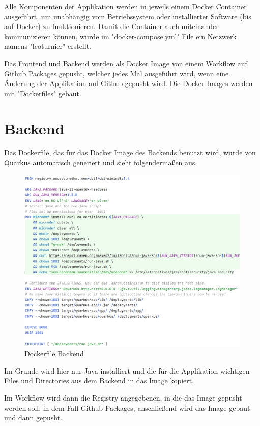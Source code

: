 Alle Komponenten der Applikation werden in jeweils einem Docker Container ausgeführt, um unabhängig vom Betriebssystem oder installierter Software (bis auf Docker) zu funktionieren. 
Damit die Container auch miteinander kommunizieren können, wurde im "docker-compose.yml" File ein Netzwerk namens "leoturnier" erstellt.

Das Frontend und Backend werden als Docker Image von einem Workflow auf Github Packages gepusht, welcher jedes Mal ausgeführt wird, wenn eine Änderung der Applikation auf Github gepusht wird.
Die Docker Images werden mit "Dockerfiles" gebaut. 

\section{Backend}

Das Dockerfile, das für das Docker Image des Backends benutzt wird, wurde von Quarkus automatisch generiert und sieht folgendermaßen aus. 

\begin{figure}[H]
    \includegraphics[scale=0.44]{pics/docker/dockerfile_backend.png}
    \caption{Dockerfile Backend}
\end{figure}

Im Grunde wird hier nur Java installiert und die für die Applikation wichtigen Files und Directories aus dem Backend in das Image kopiert.

Im Workflow wird dann die Registry angegebenen, in die das Image gepusht werden soll, in dem Fall Github Packages, anschließend wird das Image gebaut und dann gepusht.

